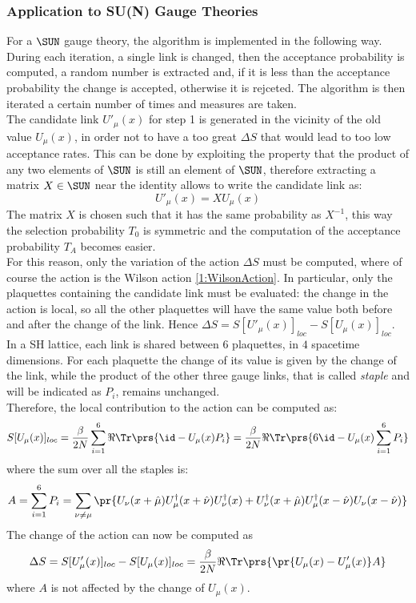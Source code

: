 \subsubsection{Application to SU(N) Gauge Theories}
For a $\SUN$ gauge theory, the algorithm is implemented in the following way.
During each iteration, a single link is changed, then the acceptance probability is computed, a random number is extracted and, if it is less than the acceptance probability the change is accepted, otherwise it is rejceted.
The algorithm is then iterated a certain number of times and measures are taken.\\
The candidate link $U'_\mu(x)$ for step 1 is generated in the vicinity of the old value $U_\mu(x)$, in order not to have a too great $\Delta S$ that would lead to too low acceptance rates.
This can be done by exploiting the property that the product of any two elements of $\SUN$ is still an element of $\SUN$, therefore extracting a matrix $X\in\SUN$ near the identity allows to write the candidate link as:
\begin{equation}
    U'_\mu(x) = XU_\mu(x) \label{2:MetropolisCandidateLink}
\end{equation}
The matrix $X$ is chosen such that it has the same probability as $X^{-1}$, this way the selection probability $T_0$ is symmetric and the computation of the acceptance probability $T_A$ becomes easier.\\
For this reason, only the variation of the action $\Delta S$ must be computed, where of course the action is the Wilson action \eqref{1:WilsonAction}.
In particular, only the plaquettes containing the candidate link must be evaluated: the change in the action is local, so all the other plaquettes will have the same value both before and after the change of the link.
Hence $\Delta S = S[U'_\mu(x)]_{loc}-S[U_\mu(x)]_{loc}$.\\
In a SH lattice, each link is shared between $6$ plaquettes, in $4$ spacetime dimensions.
For each plaquette the change of its value is given by the change of the link, while the product of the other three gauge links, that is called \emph{staple} and will be indicated as $P_i$, remains unchanged.\\
Therefore, the local contribution to the action can be computed as:
\begin{equation*}
    S[U_\mu(x)]_{loc} = \frac\beta{2N} \sum_{i=1}^6 \Re\Tr\prs{\id-U_\mu(x)P_i} = \frac\beta{2N} \Re\Tr\prs{6\id-U_\mu(x)\sum_{i=1}^6P_i}
\end{equation*}
where the sum over all the staples is:
\begin{equation}
    A = \sum_{i=1}^6P_i = \sum_{\nu\neq\mu}\pr{U_\nu(x+\hat\mu)U^\dagger_\mu(x+\hat\nu)U^\dagger_\nu(x) + U^\dagger_\nu(x+\hat\mu)U^\dagger_\mu(x-\hat\nu)U_\nu(x-\hat\nu)} \label{2:SumOverStaples}
\end{equation}
The change of the action can now be computed as
\begin{equation}
    \Delta S = S[U'_\mu(x)]_{loc}-S[U_\mu(x)]_{loc} = \frac\beta{2N} \Re\Tr\prs{\pr{U_\mu(x)-U'_\mu(x)}A} \label{2:MetropolisActionVar}
\end{equation}
where $A$ is not affected by the change of $U_\mu(x)$.

